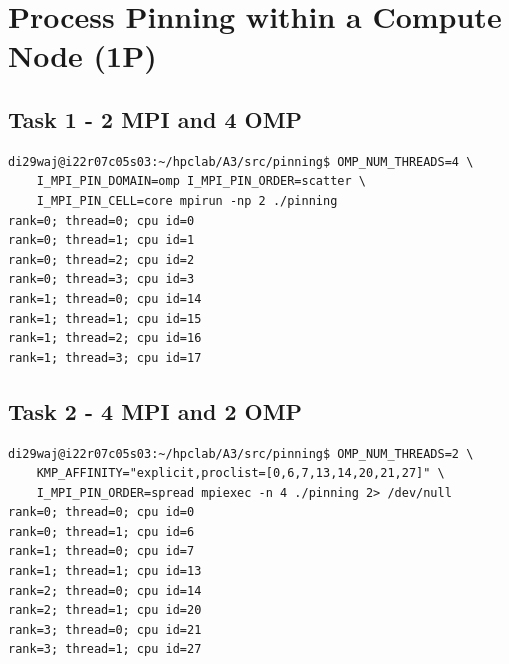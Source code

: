 \documentclass[article]{scrartcl}
\begin{document}
\section{Process Pinning within a Compute Node (1P)}
\subsection{Task 1 - 2 MPI and 4 OMP}

\begin{lstlisting}[frame=single]
di29waj@i22r07c05s03:~/hpclab/A3/src/pinning$ OMP_NUM_THREADS=4 \
    I_MPI_PIN_DOMAIN=omp I_MPI_PIN_ORDER=scatter \
    I_MPI_PIN_CELL=core mpirun -np 2 ./pinning
rank=0; thread=0; cpu id=0
rank=0; thread=1; cpu id=1
rank=0; thread=2; cpu id=2
rank=0; thread=3; cpu id=3
rank=1; thread=0; cpu id=14
rank=1; thread=1; cpu id=15
rank=1; thread=2; cpu id=16
rank=1; thread=3; cpu id=17
\end{lstlisting}

\subsection{Task 2 - 4 MPI and 2 OMP}
\begin{lstlisting}[frame=single]
di29waj@i22r07c05s03:~/hpclab/A3/src/pinning$ OMP_NUM_THREADS=2 \
    KMP_AFFINITY="explicit,proclist=[0,6,7,13,14,20,21,27]" \
    I_MPI_PIN_ORDER=spread mpiexec -n 4 ./pinning 2> /dev/null
rank=0; thread=0; cpu id=0
rank=0; thread=1; cpu id=6
rank=1; thread=0; cpu id=7
rank=1; thread=1; cpu id=13
rank=2; thread=0; cpu id=14
rank=2; thread=1; cpu id=20
rank=3; thread=0; cpu id=21
rank=3; thread=1; cpu id=27
\end{lstlisting}
\end{document}
